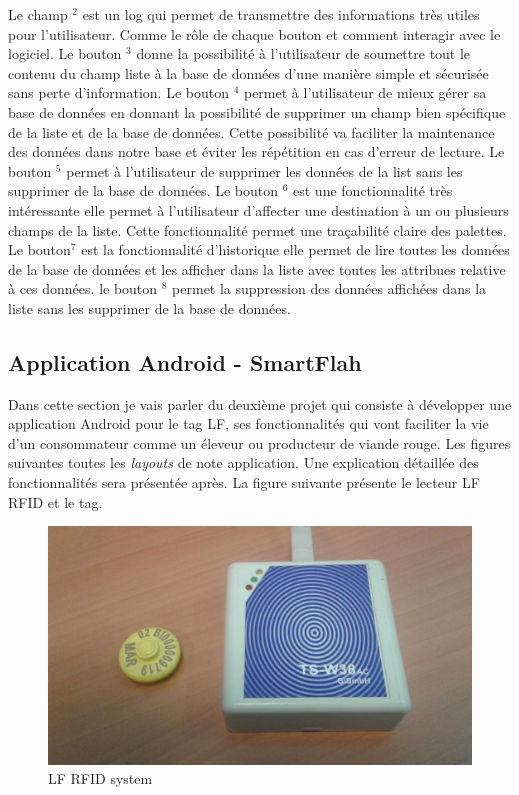 \documentclass[11pt, a4paper, twoside]{book}
\begin{document}
Le champ \(^{2}\) est un log qui permet de transmettre des informations très utiles pour l'utilisateur. Comme le rôle de chaque bouton et comment interagir avec le logiciel. Le bouton \(^{3}\) donne la possibilité à l'utilisateur de soumettre tout le contenu du champ liste à la base de données d'une manière simple et sécurisée sans perte d'information. Le bouton \(^{4}\) permet à l'utilisateur de mieux gérer sa base de données en donnant la possibilité de supprimer un champ bien spécifique de la liste et de la base de données. Cette possibilité va faciliter la maintenance des données dans notre base et éviter les répétition en cas d'erreur de lecture. Le bouton \(^{5}\) permet à l'utilisateur de supprimer les données de la list sans les supprimer de la base de données. Le bouton \(^{6}\) est une fonctionnalité très intéressante elle permet à l'utilisateur d'affecter une destination à un ou plusieurs champs de la liste. Cette fonctionnalité permet une traçabilité claire des palettes. Le bouton\(^{7}\) est la fonctionnalité d'historique elle permet de lire toutes les données de la base de données et les afficher dans la liste avec toutes les attribues relative à ces données.
le bouton \(^{8}\) permet la suppression des données affichées dans la liste sans les supprimer de la base de données.

\subsection{Application Android - SmartFlah}
Dans cette section je vais parler du deuxième projet qui consiste à développer une application Android pour le tag LF, ses fonctionnalités qui vont faciliter la vie d'un consommateur comme un éleveur ou producteur de viande rouge. Les figures suivantes toutes les \emph{layouts} de note application. Une explication détaillée des fonctionnalités sera présentée après. La figure suivante présente le lecteur LF RFID et le tag.

\begin{figure}[H]
\centering
\includegraphics[width=\textwidth]{lfreader}
\caption{LF RFID system}
\end{figure}
\end{document}
